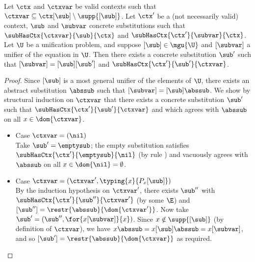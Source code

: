 \begin{lemma}
\label{lem:unification-mgu}
Let $\ctx$ and $\ctxvar$ be valid contexts such that $\ctxvar \subseteq \ctx[\sub] \setminus \supp{[\sub]}$.
Let $\ctx'$ be a (not necessarily valid) context, $\sub$ and $\subvar$ concrete substitutions such that $\subHasCtx{\ctxvar}{\sub}{\ctx}$ and $\subHasCtx{\ctx'}{\subvar}{\ctx}$.
Let $\U$ be a unification problem, and suppose $[\sub] \in \mgu{\U}$ and $[\subvar]$ a unifier of the equation in $\U$.
Then there exists a concrete substitution $\sub'$ such that $[\subvar] = [\sub][\sub']$ and $\subHasCtx{\ctx'}{\sub'}{\ctxvar}$.
\end{lemma}

\begin{proof}
Since $[\sub]$ is a most general unifier of the elements of $\U$, there exists an abstract substitution $\abssub$ such that $[\subvar] = [\sub] \abssub$.
We show by structural induction on $\ctxvar$ that there exists a concrete substitution $\sub'$ such that $\subHasCtx{\ctx'}{\sub'}{\ctxvar}$ and which agrees with $\abssub$ on all $x \in \dom{\ctxvar}$.
\begin{itemize}
	\item Case $\ctxvar = (\nil)$ \\
  Take $\sub' = \emptysub$; the empty substitution satisfies $\subHasCtx{\ctx'}{\emptysub}{\nil}$ (by rule ) and vacuously agrees with $\abssub$ on all $x \in \dom{\nil} = \emptyset$.
  \item Case $\ctxvar = (\ctxvar', \typing{x}{P_x[\sub]})$ \\
  By the induction hypothesis on $\ctxvar'$, there exists $\sub''$ with $\subHasCtx{\ctx'}{\sub''}{\ctxvar'}$ (by some $\E$) and $[\sub''] = \restr{\abssub}{\dom{\ctxvar'}}$.
  Now take $\sub' = (\sub'', \for{x[\subvar]}{x})$.
  Since $x \notin \supp{[\sub]}$ (by definition of $\ctxvar$), we have $x \abssub = x [\sub] \abssub = x[\subvar]$, and so $[\sub'] = \restr{\abssub}{\dom{\ctxvar}}$ as required.
  

\end{itemize}
\end{proof}
